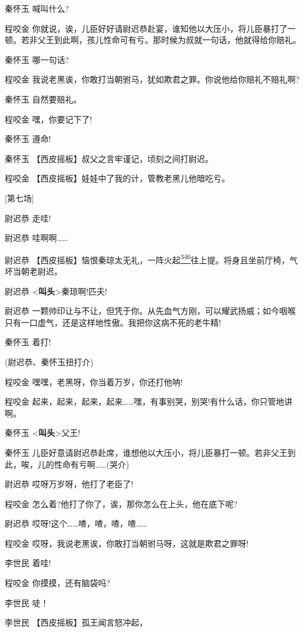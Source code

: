 秦怀玉 喊叫什么?

程咬金
你就说，诶，儿臣好好请尉迟恭赴宴，谁知他以大压小，将儿臣暴打了一顿。若非父王到此啊，孩儿性命可有亏。那时候为叔就一句话，他就得给你赔礼。

秦怀玉 哪一句话?

程咬金 我说老黑诶，你敢打当朝驸马，犹如欺君之罪。你说他给你赔礼不赔礼啊?

秦怀玉 自然要赔礼。

程咬金 嘿，你要记下了!

秦怀玉 遵命!

秦怀玉 【西皮摇板】叔父之言牢谨记，顷刻之间打尉迟。

程咬金 【西皮摇板】娃娃中了我的计，管教老黑儿他暗吃亏。

{[}第七场{]}

尉迟恭 走哇!

尉迟恭 哇啊啊\ldots{}\ldots{}

尉迟恭
【西皮摇板】恼恨秦琼太无礼，一阵火起\protect\hyperlink{fn346}{\textsuperscript{346}}往上提。将身且坐前厅椅，气坏当朝老尉迟。

尉迟恭 \textless{}\textbf{叫头}\textgreater{}秦琼啊!匹夫!

尉迟恭
一颗帅印让与不让，但凭于你。从先血气方刚，可以耀武扬威；如今咽喉只有一口虚气，还是这样地性傲。我把你这病不死的老牛精!

秦怀玉 着打!

(尉迟恭、秦怀玉扭打介)

程咬金 嘿嘿，老黑呀，你当着万岁，你还打他呐!

程咬金
起来，起来，起来，起来\ldots{}\ldots{}嘿，有事别哭，别哭!有什么话，你只管地讲啊。

秦怀玉 \textless{}\textbf{叫头}\textgreater{}父王!

秦怀玉
儿臣好意请尉迟恭赴席，谁想他以大压小，将儿臣暴打一顿。若非父王到此，唉，儿的性命有亏啊\ldots{}\ldots{}(哭介)

尉迟恭 哎呀万岁呀，他打了老臣了!

程咬金 怎么着?他打了你了，诶，那你怎么在上头，他在底下呢?

尉迟恭 哎呀!这个\ldots{}\ldots{}喳，喳，喳，喳\ldots{}\ldots{}

程咬金 哎呀，我说老黑诶，你敢打当朝驸马呀，这就是欺君之罪呀!

李世民 着哇!

程咬金 你摸摸，还有脑袋吗?

李世民 唗！

李世民 【西皮摇板】孤王闻言怒冲起，

